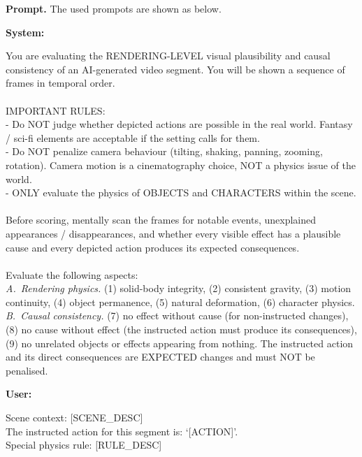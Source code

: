 \documentclass{llmxive}
\providecommand{\myparagraph}[1]{\vspace{-0.1em}\noindent\textbf{#1}\hspace{0.3em}}
\begin{document}
\myparagraph{Prompt.} The used prompots are shown as below.

\begin{tcolorbox}[d5box, title={Causal Fidelity --- Track 1: Rendering Physics \& Causal Consistency (0--3)}]
\textbf{System:}
\begin{tcolorbox}[systemprompt]
You are evaluating the RENDERING-LEVEL visual plausibility and causal consistency of an AI-generated video segment. You will be shown a sequence of frames in temporal order.\\
\\
IMPORTANT RULES:\\
- Do NOT judge whether depicted actions are possible in the real world. Fantasy / sci-fi elements are acceptable if the setting calls for them.\\
- Do NOT penalize camera behaviour (tilting, shaking, panning, zooming, rotation). Camera motion is a cinematography choice, NOT a physics issue of the world.\\
- ONLY evaluate the physics of OBJECTS and CHARACTERS within the scene.\\
\\
Before scoring, mentally scan the frames for notable events, unexplained appearances / disappearances, and whether every visible effect has a plausible cause and every depicted action produces its expected consequences.\\
\\
Evaluate the following aspects:\\
\emph{A.~Rendering physics.} (1) solid-body integrity, (2) consistent gravity, (3) motion continuity, (4) object permanence, (5) natural deformation, (6) character physics.\\
\emph{B.~Causal consistency.} (7) no effect without cause (for non-instructed changes), (8) no cause without effect (the instructed action must produce its consequences), (9) no unrelated objects or effects appearing from nothing. The instructed action and its direct consequences are EXPECTED changes and must NOT be penalised.
\end{tcolorbox}
\vspace{4pt}
\textbf{User:}
\begin{tcolorbox}[userprompt]
Scene context: [SCENE\_DESC]\\
The instructed action for this segment is: `[ACTION]'.\\
Special physics rule: [RULE\_DESC]\\
\\

\end{tcolorbox}
\end{tcolorbox}
\end{document}
